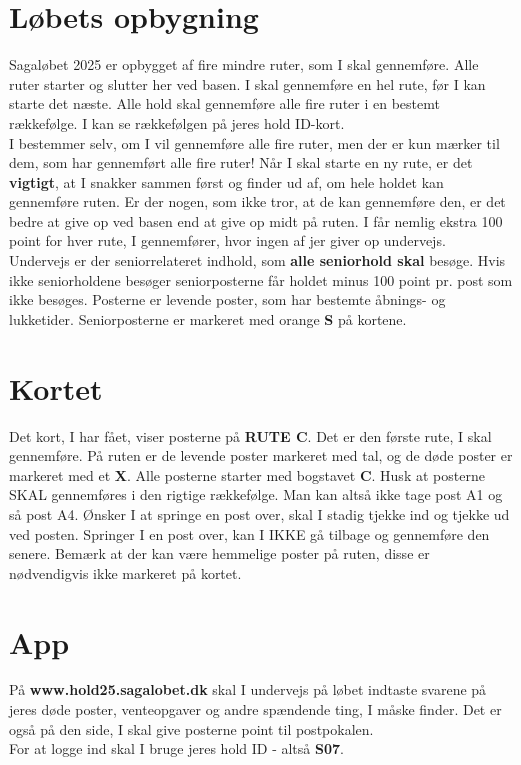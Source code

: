 \section{Løbets opbygning}
Sagaløbet 2025 er opbygget af fire mindre ruter, som I skal gennemføre. Alle ruter starter og slutter her ved basen. I skal gennemføre en hel rute, før I kan starte det næste. Alle hold skal gennemføre alle fire ruter i en bestemt rækkefølge. I kan se rækkefølgen på jeres hold ID-kort.\\\newline
I bestemmer selv, om I vil gennemføre alle fire ruter, men der er kun mærker til dem, som har gennemført alle fire ruter! Når I skal starte en ny rute, er det \textbf{vigtigt}, at I snakker sammen først og finder ud af, om hele holdet kan gennemføre ruten. Er der nogen, som ikke tror, at de kan gennemføre den, er det bedre at give op ved basen end at give op midt på ruten. I får nemlig ekstra 100 point for hver rute, I gennemfører, hvor ingen af jer giver op undervejs.\\
\newline
Undervejs er der seniorrelateret indhold, som \textbf{alle seniorhold skal} besøge. Hvis ikke seniorholdene besøger seniorposterne får holdet minus 100 point pr. post som ikke besøges. Posterne er levende poster, som har bestemte åbnings- og lukketider. Seniorposterne er markeret med orange \textbf{S} på kortene.\\
\newline
\section{Kortet}
Det kort, I har fået, viser posterne på \textbf{RUTE C}. Det er den første rute, I skal gennemføre. På ruten er de levende poster markeret med tal, og de døde poster er markeret med et \textbf{X}. Alle posterne starter med bogstavet \textbf{C}. Husk at posterne SKAL gennemføres i den rigtige rækkefølge. Man kan altså ikke tage post A1 og så post A4. Ønsker I at springe en post over, skal I stadig tjekke ind og tjekke ud ved posten. Springer I en post over, kan I IKKE gå tilbage og gennemføre den senere. Bemærk at der kan være hemmelige poster på ruten, disse er nødvendigvis ikke markeret på kortet.
\section{App}
På \textbf{www.hold25.sagalobet.dk} skal I undervejs på løbet indtaste svarene på jeres døde poster, venteopgaver og andre spændende ting, I måske finder. Det er også på den side, I skal give posterne point til postpokalen.\\
For at logge ind skal I bruge jeres hold ID - altså \textbf{S07}.
\newpage
